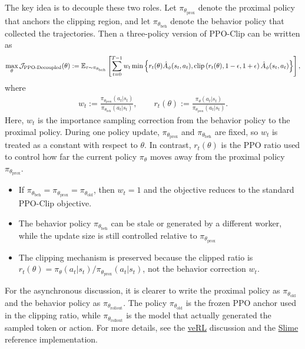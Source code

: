 The key idea is to decouple these two roles. Let $\pi_{\theta_{\text{prox}}}$ denote the proximal policy that anchors the clipping region, and let $\pi_{\theta_{\text{beh}}}$ denote the behavior policy that collected the trajectories. Then a three-policy version of PPO-Clip can be written as
\begin{align*}
    \max_{\theta}{\cal J}_{\text{PPO-Decoupled}}(\theta)
    :=
    \mathbb{E}_{\tau\sim \pi_{\theta_{\text{beh}}}}
    \left[
        \sum_{t=0}^{T-1}
        w_t
        \min\left\{
            r_t(\theta)\hat A_\phi(s_t,a_t),
            \operatorname{clip}\left(r_t(\theta),1-\epsilon,1+\epsilon\right)\hat A_\phi(s_t,a_t)
        \right\}
    \right],
\end{align*}
where
\begin{align*}
    w_t
    :=
    \frac{\pi_{\theta_{\text{prox}}}(a_t|s_t)}
    {\pi_{\theta_{\text{beh}}}(a_t|s_t)},
    \qquad
    r_t(\theta)
    :=
    \frac{\pi_{\theta}(a_t|s_t)}
    {\pi_{\theta_{\text{prox}}}(a_t|s_t)}.
\end{align*}
Here, $w_t$ is the importance sampling correction from the behavior policy to the proximal policy. During one policy update, $\pi_{\theta_{\text{prox}}}$ and $\pi_{\theta_{\text{beh}}}$ are fixed, so $w_t$ is treated as a constant with respect to $\theta$. In contrast, $r_t(\theta)$ is the PPO ratio used to control how far the current policy $\pi_\theta$ moves away from the proximal policy $\pi_{\theta_{\text{prox}}}$.

\begin{remark}
    \item
    \begin{itemize}
        \item If $\pi_{\theta_{\text{beh}}}=\pi_{\theta_{\text{prox}}}=\pi_{\theta_{\text{old}}}$, then $w_t=1$ and the objective reduces to the standard PPO-Clip objective.
        \item The behavior policy $\pi_{\theta_{\text{beh}}}$ can be stale or generated by a different worker, while the update size is still controlled relative to $\pi_{\theta_{\text{prox}}}$
        \item The clipping mechanism is preserved because the clipped ratio is $r_t(\theta)=\pi_{\theta}(a_t|s_t)/\pi_{\theta_{\text{prox}}}(a_t|s_t)$, not the behavior correction $w_t$.
    \end{itemize}
\end{remark}

For the asynchronous discussion, it is clearer to write the proximal policy as $\pi_{\theta_{\text{old}}}$ and the behavior policy as $\pi_{\theta_{\text{rollout}}}$. The policy $\pi_{\theta_{\text{old}}}$ is the frozen PPO anchor used in the clipping ratio, while $\pi_{\theta_{\text{rollout}}}$ is the model that actually generated the sampled token or action. For more details, see the \href{https://verl.readthedocs.io/en/latest/algo/rollout_corr_math.html#implementation-in-verl-the-three-policy-framework}{veRL} discussion and the \href{https://github.com/THUDM/slime}{Slime} reference implementation.


